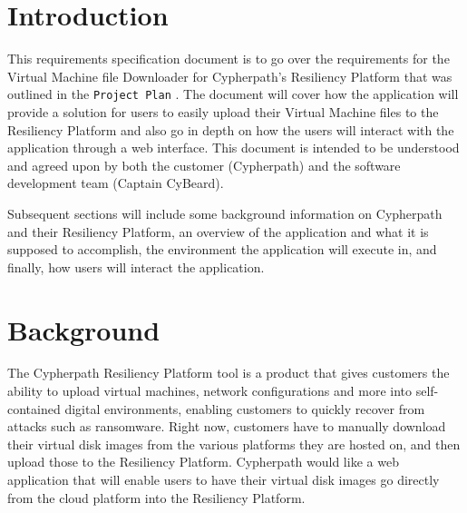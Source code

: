 \documentclass{article}
\begin{document}
    


    \tableofcontents
    \newpage
    \listoffigures


    \newpage
    \begin{versionhistory}
    \end{versionhistory}
    \newpage


    \section{Introduction}
    This requirements specification document is to go over the requirements for the Virtual Machine file Downloader for Cypherpath's Resiliency Platform that was outlined in the
    \texttt{Project Plan} \cite{projectplan}.
    The document will cover how the application will provide a solution for users to easily upload their Virtual Machine files to the Resiliency Platform and also
    go in depth on how the users will interact with the application through a web interface. This document is intended to be understood and agreed
    upon by both the customer (Cypherpath) and the software development team (Captain CyBeard).

    Subsequent sections will include some background information on Cypherpath and their Resiliency Platform, an overview of the application and what it
    is supposed to accomplish, the environment the application will execute in, and finally, how users will interact the application.


    \section{Background}
	The Cypherpath Resiliency Platform tool is a product that gives customers the ability to upload virtual machines, network configurations and more into 
    self-contained digital environments, enabling customers to quickly recover from attacks such as ransomware. Right now, customers have to manually download their virtual disk images from
    the various platforms they are hosted on, and then upload those to the Resiliency Platform. Cypherpath would like a web application that will enable users to have their virtual disk images go
    directly from the cloud platform into the Resiliency Platform.
\end{document}
